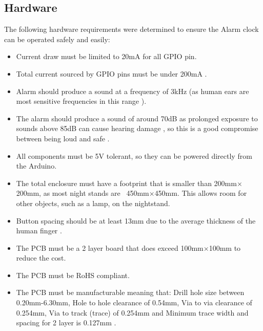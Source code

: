 \documentclass{article}
\begin{document}
\subsection{Hardware}
The following hardware requirements were determined to ensure the Alarm clock can be operated safely and easily:
\begin{itemize}
    \item Current draw must be limited to 20mA for all GPIO pin\cite{arduino}.
    \item Total current sourced by GPIO pins must be under 200mA \cite{atmega}.
    \item Alarm should produce a sound at a frequency of 3kHz (as human ears are most sensitive frequencies in this range \cite{human}).
    \item The alarm should produce a sound of around 70dB as prolonged exposure to sounds above 85dB can cause hearing damage \cite{linkbc}, so this is a good compromise between being loud and safe \cite{loud}.
    \item All components must be 5V tolerant, so they can be powered directly from the Arduino.
    \item The total enclosure must have a footprint that is smaller than 200mm$\times$200mm, as most night stands are ~450mm$\times$450mm\cite{nightstand}. This allows room for other objects, such as a lamp, on the nightstand.
    \item Button spacing should be at least 13mm due to the average thickness of the human finger \cite{finger}.
    \item The PCB must be a 2 layer board that does exceed 100mm$\times$100mm to reduce the cost.
    \item The PCB must be RoHS compliant.
    \item The PCB must be manufacturable meaning that: Drill hole size between 0.20mm-6.30mm, Hole to hole clearance of 0.54mm, Via to via clearance of 0.254mm, Via to track (trace) of 0.254mm and Minimum trace width and spacing for 2 layer is 0.127mm \cite{mfn}.
\end{itemize}
\end{document}
